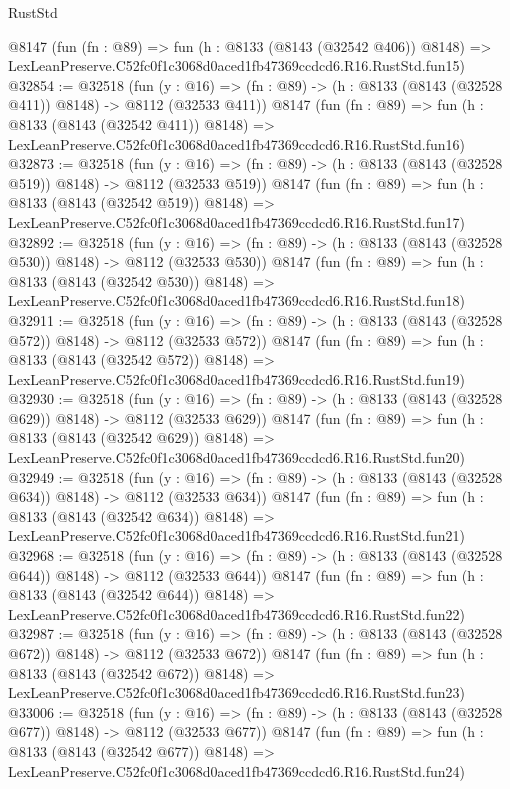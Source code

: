 \begin{lexlean}{RustStd}
\begin{coremodule}
    @8147
    (fun (fn : @89) =>
    fun (h : @8133 (@8143 (@32542 @406)) @8148) =>
    LexLeanPreserve.C52fc0f1c3068d0aced1fb47369ccdcd6.R16.RustStd.fun15)
@32854 := @32518
    (fun (y : @16) => (fn : @89) -> (h : @8133 (@8143 (@32528 @411)) @8148) -> @8112 (@32533 @411))
    @8147
    (fun (fn : @89) =>
    fun (h : @8133 (@8143 (@32542 @411)) @8148) =>
    LexLeanPreserve.C52fc0f1c3068d0aced1fb47369ccdcd6.R16.RustStd.fun16)
@32873 := @32518
    (fun (y : @16) => (fn : @89) -> (h : @8133 (@8143 (@32528 @519)) @8148) -> @8112 (@32533 @519))
    @8147
    (fun (fn : @89) =>
    fun (h : @8133 (@8143 (@32542 @519)) @8148) =>
    LexLeanPreserve.C52fc0f1c3068d0aced1fb47369ccdcd6.R16.RustStd.fun17)
@32892 := @32518
    (fun (y : @16) => (fn : @89) -> (h : @8133 (@8143 (@32528 @530)) @8148) -> @8112 (@32533 @530))
    @8147
    (fun (fn : @89) =>
    fun (h : @8133 (@8143 (@32542 @530)) @8148) =>
    LexLeanPreserve.C52fc0f1c3068d0aced1fb47369ccdcd6.R16.RustStd.fun18)
@32911 := @32518
    (fun (y : @16) => (fn : @89) -> (h : @8133 (@8143 (@32528 @572)) @8148) -> @8112 (@32533 @572))
    @8147
    (fun (fn : @89) =>
    fun (h : @8133 (@8143 (@32542 @572)) @8148) =>
    LexLeanPreserve.C52fc0f1c3068d0aced1fb47369ccdcd6.R16.RustStd.fun19)
@32930 := @32518
    (fun (y : @16) => (fn : @89) -> (h : @8133 (@8143 (@32528 @629)) @8148) -> @8112 (@32533 @629))
    @8147
    (fun (fn : @89) =>
    fun (h : @8133 (@8143 (@32542 @629)) @8148) =>
    LexLeanPreserve.C52fc0f1c3068d0aced1fb47369ccdcd6.R16.RustStd.fun20)
@32949 := @32518
    (fun (y : @16) => (fn : @89) -> (h : @8133 (@8143 (@32528 @634)) @8148) -> @8112 (@32533 @634))
    @8147
    (fun (fn : @89) =>
    fun (h : @8133 (@8143 (@32542 @634)) @8148) =>
    LexLeanPreserve.C52fc0f1c3068d0aced1fb47369ccdcd6.R16.RustStd.fun21)
@32968 := @32518
    (fun (y : @16) => (fn : @89) -> (h : @8133 (@8143 (@32528 @644)) @8148) -> @8112 (@32533 @644))
    @8147
    (fun (fn : @89) =>
    fun (h : @8133 (@8143 (@32542 @644)) @8148) =>
    LexLeanPreserve.C52fc0f1c3068d0aced1fb47369ccdcd6.R16.RustStd.fun22)
@32987 := @32518
    (fun (y : @16) => (fn : @89) -> (h : @8133 (@8143 (@32528 @672)) @8148) -> @8112 (@32533 @672))
    @8147
    (fun (fn : @89) =>
    fun (h : @8133 (@8143 (@32542 @672)) @8148) =>
    LexLeanPreserve.C52fc0f1c3068d0aced1fb47369ccdcd6.R16.RustStd.fun23)
@33006 := @32518
    (fun (y : @16) => (fn : @89) -> (h : @8133 (@8143 (@32528 @677)) @8148) -> @8112 (@32533 @677))
    @8147
    (fun (fn : @89) =>
    fun (h : @8133 (@8143 (@32542 @677)) @8148) =>
    LexLeanPreserve.C52fc0f1c3068d0aced1fb47369ccdcd6.R16.RustStd.fun24)

\end{coremodule}
\end{lexlean}
